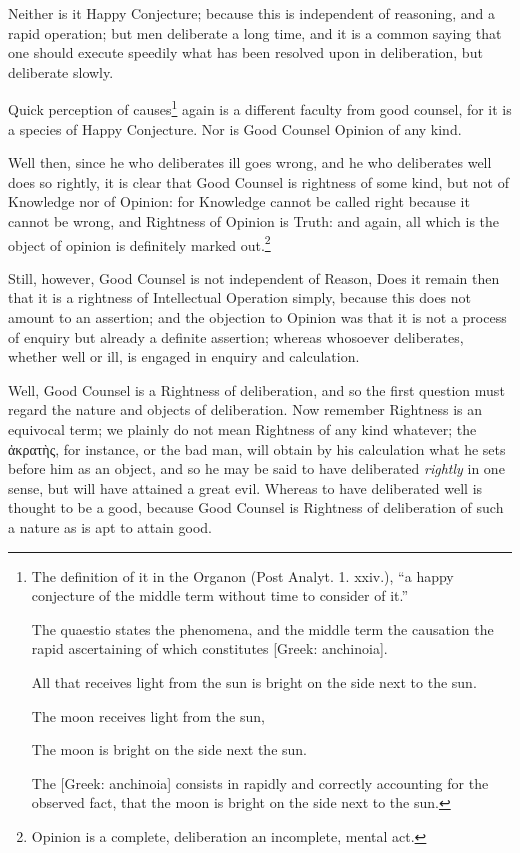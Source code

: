 Neither is it Happy Conjecture; because this is independent of reasoning, and a
rapid operation; but men deliberate a long time, and it is a common saying that
one should execute speedily what has been resolved upon in deliberation, but
deliberate slowly.

Quick perception of causes\footnote{The definition of it in the Organon (Post Analyt. 1. xxiv.), “a happy
conjecture of the middle term without time to consider of it.”

The quaestio states the phenomena, and the middle term the causation the
rapid ascertaining of which constitutes [Greek: anchinoia].

All that receives light from the sun is bright on the side next to the
sun.

The moon receives light from the sun,

The moon is bright on the side next the sun.

The [Greek: anchinoia] consists in rapidly and correctly accounting for the
observed fact, that the moon is bright on the side next to the sun.}
again is a different faculty from good counsel, for it is a species of Happy
Conjecture. Nor is Good Counsel Opinion of any kind.

Well then, since he who deliberates ill goes wrong, and he who deliberates well
does so rightly, it is clear that Good Counsel is rightness of some kind, but
not of Knowledge nor of Opinion: for Knowledge cannot be called right because
it cannot be wrong, and Rightness of Opinion is Truth: and again, all which is
the object of opinion is definitely marked
out.\footnote{Opinion is a complete, deliberation an incomplete, mental act.}

Still, however, Good Counsel is not independent of Reason, Does it remain then
that it is a rightness of Intellectual Operation simply, because this does not
amount to an assertion; and the objection to Opinion was that it is not a
process of enquiry but already a definite assertion; whereas whosoever
deliberates, whether well or ill, is engaged in enquiry and calculation.

Well, Good Counsel is a Rightness of deliberation, and so the first question
must regard the nature and objects of deliberation. Now remember Rightness is
an equivocal term; we plainly do not mean Rightness of any kind whatever; the
ἀκρατὴς, for instance, or the bad man,
will obtain by his calculation what he sets before him as an object, and so he
may be said to have deliberated \emph{rightly} in one sense, but will have
attained a great evil. Whereas to have deliberated well is thought to be a
good, because Good Counsel is Rightness of deliberation of such a nature as is
apt to attain good.

